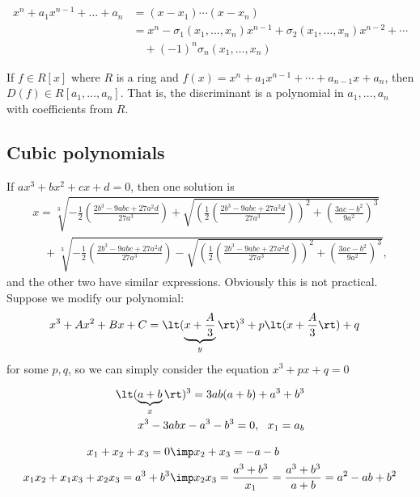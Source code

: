 \documentclass[a4paper]{article}
\begin{document}
\begin{ttheorem}
\begin{align*}
  x^n+a_1x^{n-1}+\ldots+a_n &= (x-x_1)\cdots(x-x_n) \\
  &= x^n-\sigma_1(x_1,\ldots, x_n)x^{n-1}+\sigma_2(x_1,\ldots, x_n)x^{n-2}+\cdots\\
  &\quad+(-1)^n\sigma_n(x_1,\ldots, x_n)
\end{align*}
\end{ttheorem}

\begin{tcorollary}
  If \( f\in R[x] \) where \( R \) is a ring and \( f(x) = x^n + a_{1}x^{n-1} + \cdots + a_{n-1}x + a_n \), then \( D(f)\in R[a_1,\ldots,a_n] \). That is, the discriminant is a polynomial in \( a_1,\ldots,a_n \) with coefficients from \( R \).
\end{tcorollary}

\subsection{Cubic polynomials}
If \( ax^3+bx^2+cx+d = 0 \), then one solution is
\begin{align*}
  x = \sqrt[3]{-\frac{1}{2} \left(\frac{2b^3 - 9abc + 27a^2d}{27a^3}\right) + \sqrt{\left(\frac{1}{2} \left(\frac{2b^3 - 9abc + 27a^2d}{27a^3}\right)\right)^2 + \left(\frac{3ac - b^2}{9a^2}\right)^3}} \\
  \quad + \sqrt[3]{-\frac{1}{2} \left(\frac{2b^3 - 9abc + 27a^2d}{27a^3}\right) - \sqrt{\left(\frac{1}{2} \left(\frac{2b^3 - 9abc + 27a^2d}{27a^3}\right)\right)^2 + \left(\frac{3ac - b^2}{9a^2}\right)^3}},
\end{align*}
and the other two have similar expressions.
Obviously this is not practical.
Suppose we modify our polynomial:
\begin{align*}
  x^3+Ax^2+Bx+C &= \lt(\underbrace{x+\frac{A}{3}}_{y}\rt)^3+p\lt(x+\frac{A}{3}\rt) + q
\end{align*}
for some \( p,q \), so we can simply consider the equation \( x^3+px+q = 0 \)

\begin{align*}
  \lt(\underbrace{a+b}_x\rt)^3 = 3ab(a+b) + a^3+b^3 \\
  x^3-3abx-a^3-b^3 = 0,\ \ x_1= a_b
\end{align*}

\begin{align*}
  x_1+x_2+x_3 = 0 &\imp x_2+x_3 = -a-b \\
  x_1x_2+x_1x_3+x_2x_3 = a^3+b^3 &\imp x_2x_3 = \frac{a^3+b^3}{x_1} = \frac{a^3+b^3}{a+b} = a^2-ab+b^2
\end{align*}
\end{document}
